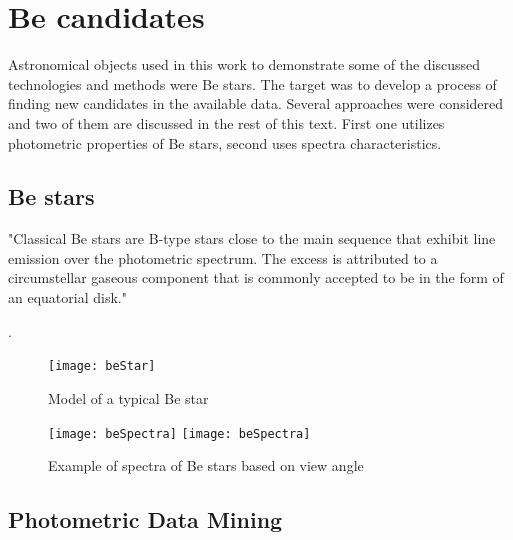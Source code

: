 \chapter{Be candidates}
Astronomical objects used in this work to demonstrate some of the
discussed technologies and methods were Be stars. The target was to
develop a process of finding new candidates in the available
data. Several approaches were considered and two of them are discussed
in the rest of this text. First one utilizes photometric properties
of Be stars, second uses spectra characteristics.


\section{Be stars}

"Classical Be stars are B-type stars close to the main sequence that
exhibit line emission over the photometric spectrum. The excess is
attributed to a circumstellar gaseous component that is commonly
accepted to be in the form of an equatorial disk."

\cite{porter2003classical}.

    \begin{figure}[!htbp]
      \begin{center}
        \leavevmode
        \ifpdf
        \else
        \texttt{[image: beStar]}
        \fi
        \caption{Model of a typical Be star \cite{hirata1984star}}
        \label{Figjhk_be_b}
      \end{center}
    \end{figure}

    \begin{figure}[!htbp]
      \begin{center}
        \leavevmode
        \ifpdf
        \texttt{[image: beSpectra]}
        \else
        \texttt{[image: beSpectra]}
        \fi
        \caption{Example of spectra of Be stars based on view angle
          \cite{slettebak1988stars}}
        \label{Figjhk_be_b}
      \end{center}
    \end{figure}

\clearpage

\section{Photometric Data Mining}

